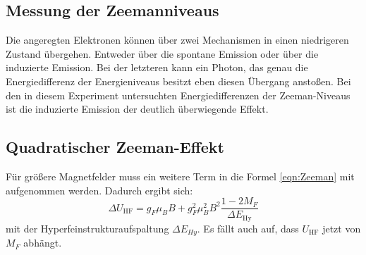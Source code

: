\subsection{Messung der Zeemanniveaus}
Die angeregten Elektronen können über zwei Mechanismen in einen niedrigeren Zustand übergehen. Entweder über die spontane Emission oder über die induzierte Emission. Bei der letzteren kann ein Photon, das genau die Energiedifferenz der Energieniveaus besitzt eben diesen Übergang anstoßen. Bei den in diesem Experiment untersuchten Energiedifferenzen der Zeeman-Niveaus ist die induzierte Emission der deutlich überwiegende Effekt.
\subsection{Quadratischer Zeeman-Effekt}
Für größere Magnetfelder muss ein weitere Term in die Formel \eqref{eqn:Zeeman} mit aufgenommen werden. Dadurch ergibt sich:
\begin{equation}
	\Delta U_\text{HF}=g_F\mu_BB + g_F^2\mu_B^2B^2\frac{1-2M_F}{\Delta E_\text{Hy}}
	\label{quad}
\end{equation}
mit der Hyperfeinstrukturaufspaltung $\Delta E_{Hy}$. Es fällt auch auf, dass $U_\text{HF}$ jetzt von $M_F$ abhängt.
